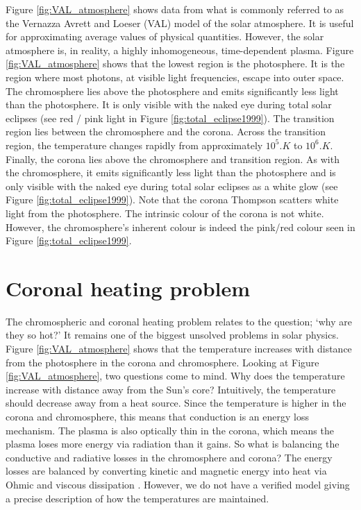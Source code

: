Figure \ref{fig:VAL_atmosphere} shows data from what is commonly referred to as the Vernazza Avrett and Loeser (VAL) \citep{Vernazza1981} model of the solar atmosphere. It is useful for approximating average values of physical quantities. However, the solar atmosphere is, in reality, a highly inhomogeneous, time-dependent plasma. Figure \ref{fig:VAL_atmosphere} shows that the lowest region is the photosphere. It is the region where most photons, at visible light frequencies, escape into outer space. The chromosphere lies above the photosphere and emits significantly less light than the photosphere. It is only visible with the naked eye during total solar eclipses (see red / pink light in Figure \ref{fig:total_eclipse1999}). The transition region lies between the chromosphere and the corona. Across the transition region, the temperature changes rapidly from approximately $10^5\si{.K}$ to $10^6\si{.K}$. Finally, the corona lies above the chromosphere and transition region. As with the chromosphere, it emits significantly less light than the photosphere and is only visible with the naked eye during total solar eclipses as a white glow (see Figure \ref{fig:total_eclipse1999}). Note that the corona Thompson scatters white light from the photosphere. The intrinsic colour of the corona is not white. However, the chromosphere's inherent colour is indeed the pink/red colour seen in Figure \ref{fig:total_eclipse1999}.

\section{Coronal heating problem}
\label{sec:coronal_heating_problem}

The chromospheric and coronal heating problem relates to the question; `why are they so hot?' It remains one of the biggest unsolved problems in solar physics. Figure \ref{fig:VAL_atmosphere} shows that the temperature increases with distance from the photosphere in the corona and chromosphere. Looking at Figure \ref{fig:VAL_atmosphere}, two questions come to mind. Why does the temperature increase with distance away from the Sun's core? Intuitively, the temperature should decrease away from a heat source. Since the temperature is higher in the corona and chromosphere, this means that conduction is an energy loss mechanism. The plasma is also optically thin in the corona, which means the plasma loses more energy via radiation than it gains. So what is balancing the conductive and radiative losses in the chromosphere and corona?
The energy losses are balanced by converting kinetic and magnetic energy into heat via Ohmic and viscous dissipation \citep{Klimchuk2015}. However, we do not have a verified model giving a precise description of how the temperatures are maintained.

